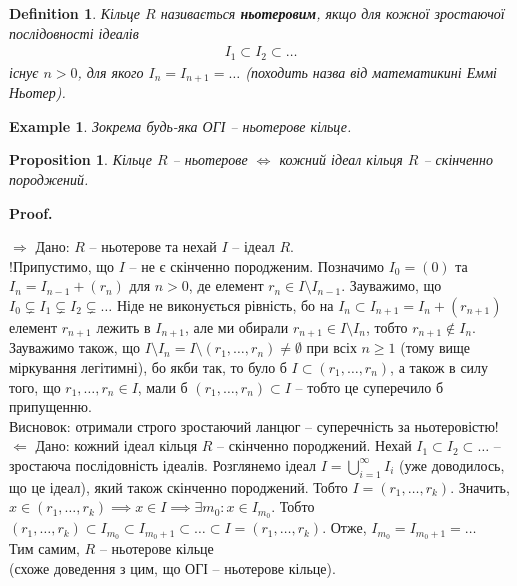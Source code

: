 \documentclass[a4paper, 10pt]{article}
\makeatletter
\def\rightproof{$\boxed{\Rightarrow}$ }
\def\leftproof{$\boxed{\Leftarrow}$ }
\theoremstyle{theoremdd}
\theoremstyle{theoremdd}
\newtheorem{definition}[theorem]{Definition}
\theoremstyle{theoremdd}
\theoremstyle{theoremdd}
\theoremstyle{theoremdd}
\newtheorem{example}[theorem]{Example}
\theoremstyle{theoremdd}
\theoremstyle{theoremdd}
\theoremstyle{theoremdd}
\theoremstyle{theoremdd}
\newtheorem{proposition}[theorem]{Proposition}
\theoremstyle{theoremdd}
\theoremstyle{theoremdd}
\theoremstyle{theoremdd}
\theoremstyle{theoremdd}
\theoremstyle{theoremdd}
\theoremstyle{theoremdd}
\renewenvironment{proof}[1][Proof.\\]{\par
\pushQED{\hfill \qed}%
\normalfont \topsep6\p@\@plus6\p@\relax
\trivlist
\item\relax
{\bfseries
#1\@addpunct{.}}\hspace\labelsep\ignorespaces
}{%
\popQED\endtrivlist\@endpefalse
}
\makeatother
\begin{document}
\begin{definition}
Кільце $R$ називається \textbf{ньотеровим}, якщо для кожної зростаючої послідовності ідеалів
\begin{align*}
I_1 \subset I_2 \subset \dots
\end{align*}
існує $n>0$, для якого $I_n = I_{n+1} = \dots$ (походить назва від математикині Еммі Ньотер).
\end{definition}

\begin{example}
Зокрема будь-яка ОГІ -- ньотерове кільце.
\end{example}

\begin{proposition}
Кільце $R$ -- ньотерове $\iff $ кожний ідеал кільця $R$ -- скінченно породжений.
\end{proposition}

\begin{proof}
\rightproof Дано: $R$ -- ньотерове та нехай $I$ -- ідеал $R$. \\
!Припустимо, що $I$ -- не є скінченно породженим. Позначимо $I_0 = (0)$ та $I_n = I_{n-1} + (r_n)$ для $n > 0$, де елемент $r_n \in I \setminus I_{n-1}$. Зауважимо, що $I_0 \subsetneq I_1 \subsetneq I_2 \subsetneq \dots$ Ніде не виконується рівність, бо на $I_{n} \subset I_{n+1} = I_{n} + (r_{n+1})$ елемент $r_{n+1}$ лежить в $I_{n+1}$, але ми обирали $r_{n+1} \in I \setminus I_n$, тобто $r_{n+1} \notin I_n$. Зауважимо також, що $I \setminus I_n = I \setminus (r_1,\dots,r_n) \neq \emptyset$ при всіх $n \geq 1$ (тому вище міркування легітимні), бо якби так, то було б $I \subset (r_1,\dots,r_n)$, а також в силу того, що $r_1,\dots,r_n \in I$, мали б $(r_1,\dots,r_n) \subset I$ -- тобто це суперечило б припущенню.\\
Висновок: отримали строго зростаючий ланцюг -- суперечність за ньотеровістю!
\bigskip \\
\leftproof Дано: кожний ідеал кільця $R$ -- скінченно породжений. Нехай $I_1 \subset I_2 \subset \dots$ -- зростаюча послідовність ідеалів. Розглянемо ідеал $I = \displaystyle\bigcup_{i=1}^\infty I_i$ (уже доводилось, що це ідеал), який також скінченно породжений. Тобто $I = (r_1,\dots,r_k)$. Значить, $x \in (r_1,\dots,r_k) \implies x \in I \implies \exists m_0: x \in I_{m_0}$. Тобто $(r_1,\dots,r_k) \subset I_{m_0} \subset I_{m_0 + 1} \subset \dots \subset I = (r_1,\dots,r_k)$. Отже, $I_{m_0} = I_{m_0+1} = \dots$ \\
Тим самим, $R$ -- ньотерове кільце \\
(схоже доведення з цим, що ОГІ -- ньотерове кільце).
\end{proof}
\end{document}
